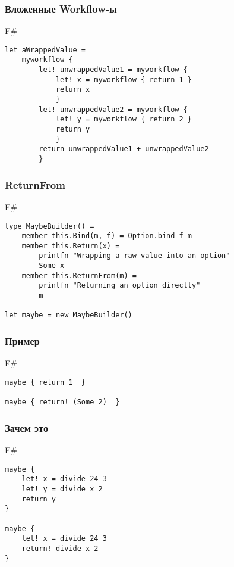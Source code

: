 \documentclass[xetex,mathserif,serif]{beamer}
\begin{document}
	\begin{frame}[fragile]
		\frametitle{Вложенные Workflow-ы}
		\begin{exampleblock}{F\#}
			\begin{verbatim}
let aWrappedValue = 
    myworkflow {
        let! unwrappedValue1 = myworkflow {
            let! x = myworkflow { return 1 }
            return x
            }
        let! unwrappedValue2 = myworkflow {
            let! y = myworkflow { return 2 }
            return y
            }
        return unwrappedValue1 + unwrappedValue2
        }
			\end{verbatim}
		\end{exampleblock}
\end{frame}

	\begin{frame}[fragile]
		\frametitle{ReturnFrom}
		\begin{exampleblock}{F\#}
			\begin{verbatim}
type MaybeBuilder() =
    member this.Bind(m, f) = Option.bind f m
    member this.Return(x) = 
        printfn "Wrapping a raw value into an option"
        Some x
    member this.ReturnFrom(m) = 
        printfn "Returning an option directly"
        m

let maybe = new MaybeBuilder()
			\end{verbatim}
		\end{exampleblock}
\end{frame}

	\begin{frame}[fragile]
		\frametitle{Пример}
		\begin{exampleblock}{F\#}
			\begin{verbatim}
maybe { return 1  }

maybe { return! (Some 2)  }
			\end{verbatim}
		\end{exampleblock}
\end{frame}

	\begin{frame}[fragile]
		\frametitle{Зачем это}
		\begin{exampleblock}{F\#}
			\begin{verbatim}
maybe {
    let! x = divide 24 3
    let! y = divide x 2
    return y 
}

maybe {
    let! x = divide 24 3
    return! divide x 2  
}
			\end{verbatim}
		\end{exampleblock}
\end{frame}
\end{document}

